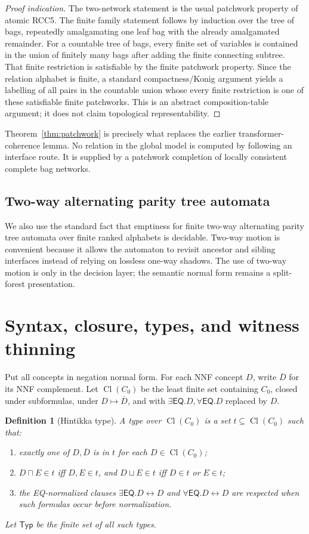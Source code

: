 \documentclass[11pt]{article}
\newtheorem{definition}[theorem]{Definition}
\newcommand{\EQ}{\mathsf{EQ}}
\newcommand{\Cl}{\operatorname{Cl}}
\begin{document}
\begin{proof}[Proof indication]
The two-network statement is the usual patchwork property of atomic RCC5.  The finite
family statement follows by induction over the tree of bags, repeatedly amalgamating one
leaf bag with the already amalgamated remainder.  For a countable tree of bags, every
finite set of variables is contained in the union of finitely many bags after adding the
finite connecting subtree.  That finite restriction is satisfiable by the finite
patchwork property.  Since the relation alphabet is finite, a standard compactness/Konig
argument yields a labelling of all pairs in the countable union whose every finite
restriction is one of these satisfiable finite patchworks.  This is an abstract
composition-table argument; it does not claim topological representability.
\end{proof}

Theorem~\ref{thm:patchwork} is precisely what replaces the earlier transformer-coherence
lemma.  No relation in the global model is computed by following an interface route.  It
is supplied by a patchwork completion of locally consistent complete bag networks.

\subsection{Two-way alternating parity tree automata}

We also use the standard fact that emptiness for finite two-way alternating parity tree
automata over finite ranked alphabets is decidable.  Two-way motion is convenient because
it allows the automaton to revisit ancestor and sibling interfaces instead of relying on
lossless one-way shadows.  The use of two-way motion is only in the decision layer; the
semantic normal form remains a split-forest presentation.

\section{Syntax, closure, types, and witness thinning}

Put all concepts in negation normal form.  For each NNF concept $D$, write $\overline D$
for its NNF complement.  Let $\Cl(C_0)$ be the least finite set containing $C_0$, closed
under subformulas, under $D\mapsto\overline D$, and with $\exists\EQ.D,\forall\EQ.D$
replaced by $D$.

\begin{definition}[Hintikka type]
A type over $\Cl(C_0)$ is a set $t\subseteq\Cl(C_0)$ such that:
\begin{enumerate}[label=(T\arabic*)]
\item exactly one of $D,\overline D$ is in $t$ for each $D\in\Cl(C_0)$;
\item $D\sqcap E\in t$ iff $D,E\in t$, and $D\sqcup E\in t$ iff $D\in t$ or $E\in t$;
\item the EQ-normalized clauses $\exists\EQ.D\leftrightarrow D$ and
$\forall\EQ.D\leftrightarrow D$ are respected when such formulas occur before
normalization.
\end{enumerate}
Let $\mathsf{Typ}$ be the finite set of all such types.
\end{definition}
\end{document}
